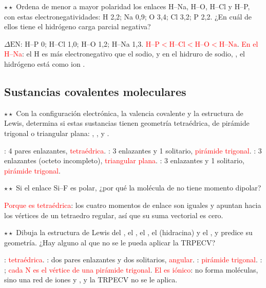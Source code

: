 \begin{exercise}
    \(\star\star\) Ordena de menor a mayor polaridad los enlaces H--Na, H--O, H--Cl y H--P, con estas electronegatividades:
    H 2,2; Na 0,9; O 3,4; Cl 3,2; P 2,2. ¿En cuál de ellos tiene el hidrógeno carga parcial negativa?
    \begin{solu}
        \(\Delta\mathrm{EN}\): H--P 0; H--Cl 1,0; H--O 1,2; H--Na 1,3. \textcolor{red}{\(\text{H--P} < \text{H--Cl} < \text{H--O} <
        \text{H--Na}\)}. \textcolor{red}{En el H--Na}: el H es más electronegativo que el sodio, y en el hidruro de sodio, ,
        el hidrógeno está como ion .
    \end{solu}
\end{exercise}

\subsection{Sustancias covalentes moleculares}

\begin{exercise}
    \(\star\star\) Con la configuración electrónica, la valencia covalente y la estructura de Lewis, determina si estas sustancias
    tienen geometría tetraédrica, de pirámide trigonal o triangular plana: , ,  y .
    \begin{solu}
        : 4 pares enlazantes, \textcolor{red}{tetraédrica}. : 3 enlazantes y 1 solitario, \textcolor{red}{pirámide
        trigonal}. : 3 enlazantes (octeto incompleto), \textcolor{red}{triangular plana}. : 3 enlazantes y 1
        solitario, \textcolor{red}{pirámide trigonal}.
    \end{solu}
\end{exercise}

\begin{exercise}
    \(\star\star\) Si el enlace Si--F es polar, ¿por qué la molécula de  no tiene momento dipolar?
    \begin{solu}
        \textcolor{red}{Porque es tetraédrica}: los cuatro momentos de enlace son iguales y apuntan hacia los vértices de un
        tetraedro regular, así que su suma vectorial es cero.
    \end{solu}
\end{exercise}

\begin{exercise}
    \(\star\star\) Dibuja la estructura de Lewis del , el , el , el  (hidracina) y el
    , y predice su geometría. ¿Hay alguno al que no se le pueda aplicar la TRPECV?
    \begin{solu}
        : \textcolor{red}{tetraédrica}. : dos pares enlazantes y dos solitarios, \textcolor{red}{angular}.
        : \textcolor{red}{pirámide trigonal}. : ;
        \textcolor{red}{cada N es el vértice de una pirámide trigonal}. \textcolor{red}{El  es iónico}: no forma
        moléculas, sino una red de iones  y , y la TRPECV no se le aplica.
    \end{solu}
\end{exercise}

